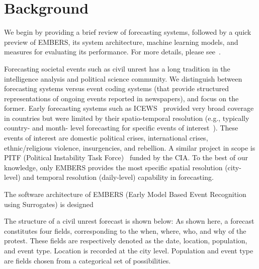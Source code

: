 \section{Background}
We begin by providing a brief review of forecasting systems, followed by a
quick preview of EMBERS, its system architecture, machine learning models,
and measures for evaluating its performance. For more details, please see~\cite{kdd-beating}.

Forecasting societal events such as civil unrest has a long tradition in the intelligence analysis and political science
community. We distinguish between forecasting systems versus event coding systems (that provide
structured representations of ongoing events reported in newspapers), and focus on the former.
Early forecasting systems such as ICEWS~\cite{icews} provided very broad coverage in countries but
were limited by their spatio-temporal resolution (e.g., typically country- and month- level forecasting for
specific events of interest~\cite{eoiprediction}). These events of interest are
domestic political crises, international crises, ethnic/religious violence, insurgencies,
and rebellion.
A similar project in scope is PITF (Political Instability
Task Force)~\cite{pitf} funded by the CIA.
To the best of our knowledge, only EMBERS provides
the most specific spatial resolution (city-level) and temporal resolution (daily-level) capability in forecasting. 

The software architecture of EMBERS (Early Model Based Event Recognition using Surrogates) is designed 

The structure of a civil unrest forecast is shown below:
As shown here, a forecast constitutes four fields, corresponding to the when, where, who, and why
of the protest. These fields are respectively denoted as the date, location, population, and event type.
Location is recorded at the city level. Population and event type are fields chosen from a categorical
set of possibilities. 

